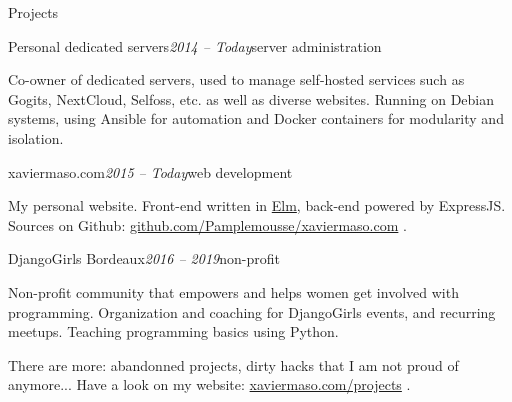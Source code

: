 \begin{rSection}{Projects}

  \begin{rSubsection}{Personal dedicated servers}{\em 2014 -- Today}{server administration}{}
    \item[] Co-owner of dedicated servers, used to manage self-hosted services such as Gogits, NextCloud, Selfoss, etc. as well as diverse websites.
            Running on Debian systems, using Ansible for automation and Docker containers for modularity and isolation.
  \end{rSubsection}

  \begin{rSubsection}{xaviermaso.com}{\em 2015 -- Today}{web development}{}
    \item[] My personal website. Front-end written in \href{http://elm-lang.org/}{Elm}, back-end powered by ExpressJS. \\
            Sources on Github: \href{https://github.com/Pamplemousse/xaviermaso.com}{github.com/Pamplemousse/xaviermaso.com} .
  \end{rSubsection}

  \begin{rSubsection}{DjangoGirls Bordeaux}{\em 2016 -- 2019}{non-profit}{}
    \item[] Non-profit community that empowers and helps women get involved with programming.
            Organization and coaching for DjangoGirls events, and recurring meetups. Teaching programming basics using Python.
  \end{rSubsection}

  \item[]
    There are more: abandonned projects, dirty hacks that I am not proud of anymore... Have a look on my website: \href{http://xaviermaso.com/projects}{xaviermaso.com/projects} .

\end{rSection}

